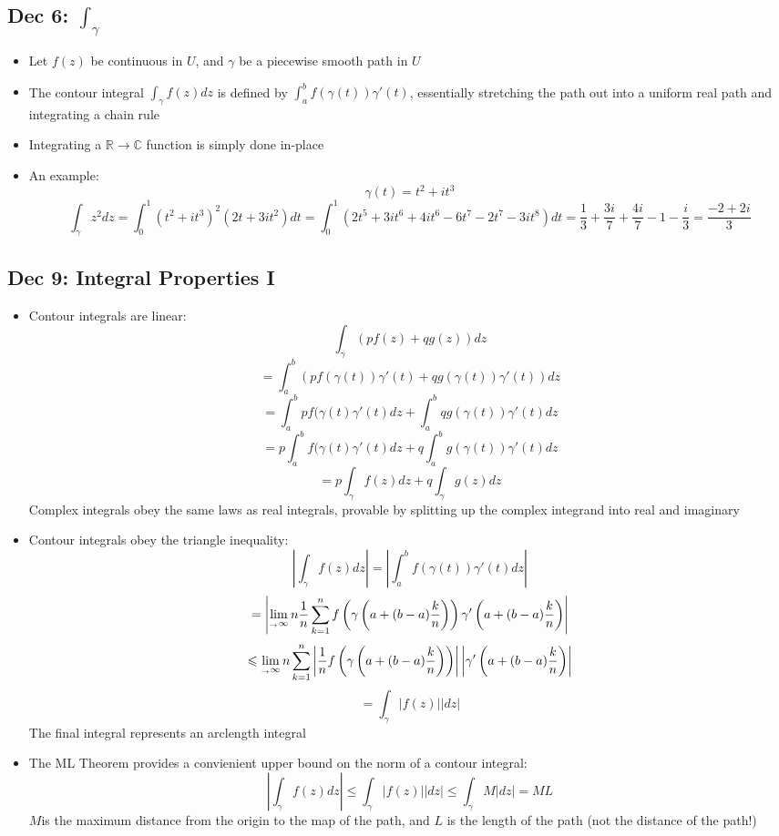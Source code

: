 \documentclass[10pt, oneside]{article}
\newcommand{\lti}[1]{\lim_{#1 \rightarrow \infty}}
\let\leq\leqslant
\newcommand{\R}{\mathbb{R}}
\newcommand{\C}{\mathbb{C}}
\begin{document}
\subsection{Dec 6: $\int_\gamma$}
\begin{itemize}
    \item Let $f(z)$ be continuous in $U$, and $\gamma$ be a piecewise smooth path in $U$
    \item The contour integral $\int_\gamma f(z) dz$ is defined by $\int_a^b f(\gamma(t)) \gamma'(t)$, essentially stretching the path out into a uniform real path and integrating a chain rule
    \item Integrating a $\R \rightarrow \C$ function is simply done in-place
    \item An example: 
        \[\gamma(t) = t^2 + it^3\]
        \[\int_\gamma z^2 dz = \int_0^1 (t^2 + it^3)^2 (2t + 3it^2) dt = \int_0^1 (2t^5 + 3it^6 + 4it^6 -6t^7 -2t^7 -3it^8) dt = \frac{1}{3} + \frac{3i}{7} + \frac{4i}{7} - 1 - \frac{i}{3} = \frac{-2 + 2i}{3}\]
\end{itemize}

\subsection{Dec 9: Integral Properties I}
\begin{itemize}
    \item Contour integrals are linear:
        \[\int_\gamma (pf(z) + qg(z)) dz\]
        \[= \int_a^b (pf(\gamma(t))\gamma'(t) + qg(\gamma(t))\gamma'(t)) dz\]
        \[= \int_a^b pf(\gamma(t)\gamma'(t) dz + \int _a^b qg(\gamma(t))\gamma'(t) dz\]
        \[= p\int_a^b f(\gamma(t)\gamma'(t) dz + q\int _a^b g(\gamma(t))\gamma'(t) dz\]
        \[= p\int_\gamma f(z) dz + q\int_\gamma g(z) dz\]
        Complex integrals obey the same laws as real integrals, provable by splitting up the complex integrand into real and imaginary
    \item Contour integrals obey the triangle inequality:
        \[\left|\int_\gamma f(z) dz \right| = \left|\int_a^b f(\gamma(t))\gamma'(t) dz \right|\]
        \[= \left|\lti_{n} \frac{1}{n} \sum_{k = 1}^{n} f \left (\gamma \left(a + (b-a) \frac{k}{n} \right)\right) \gamma'\left(a + (b-a) \frac{k}{n}\right)\right|\]
        \[\leq \lti_{n} \sum_{k = 1}^{n} \left| \frac{1}{n} f \left (\gamma \left(a + (b-a) \frac{k}{n} \right)\right) \right| \left| \gamma'\left(a + (b-a) \frac{k}{n}\right)\right|\]
        \[= \int_\gamma |f(z)| |dz|\]
        The final integral represents an arclength integral
    \item The ML Theorem provides a convienient upper bound on the norm of a contour integral:
        \[\left|\int_\gamma f(z) dz \right| \leq \int_\gamma |f(z)| |dz| \leq \int_\gamma M |dz| = ML\]
        $M$is the maximum distance from the origin to the map of the path, and $L$ is the length of the path (not the distance of the path!)
\end{itemize}
\end{document}
